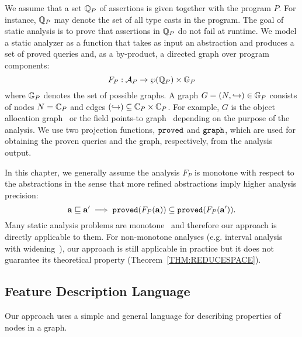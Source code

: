 We assume that a set $\mathbb{Q}_P$ of assertions is given together with the program $P$. For instance, $\mathbb{Q}_P$ may denote the set of all type casts in the program. The goal of static analysis is to prove that assertions in $\mathbb{Q}_P$ do not fail at runtime.
We model a static analyzer as a function that takes as input an abstraction and
produces a set of proved queries and, as a by-product, a directed graph over program components:
\[
F_P: \mathcal{A}_P \to \wp(\mathbb{Q}_P)\times \mathbb{G}_P
\]
where $\mathbb{G}_P$ denotes the set of possible graphs. A graph $G = (N,\hookrightarrow) \in \mathbb{G}_P$ consists of nodes $N = \mathbb{C}_P$ and edges $(\hookrightarrow) \subseteq \mathbb{C}_P \times \mathbb{C}_P$.
For example, $G$ is the object allocation graph~\cite{Li2018b} or the field points-to graph~\cite{Tan2017} depending on the purpose of the analysis.
We use two projection functions, ${\tt proved}$ and
${\tt graph}$, which are used for obtaining the proven queries and the graph, respectively, from the analysis output.

In this chapter, we generally assume  the analysis $F_P$ is monotone with respect to the abstractions in the sense that more refined abstractions imply higher analysis precision:
\begin{equation}\label{eq:mono}
{\bf a} \sqsubseteq {\bf a}' \implies {\tt proved}(F_P({\bf a})) \subseteq {{\tt proved}}(F_P({\bf a}')).
\end{equation}
Many static analysis problems are monotone~\cite{JeJeChOh17,Liang2011learning,Liang2011,Zhang2014,Li2018a,Tan2017} and therefore our approach is directly applicable to them. For non-monotone analyses (e.g. interval analysis with widening~\cite{cha2016learning}), our approach is still applicable in practice but it does not guarantee its theoretical property (Theorem~\ref{THM:REDUCESPACE}).

\subsection{Feature Description Language}\label{sec:feat-language}

Our approach uses a simple and general language for describing properties of nodes in a graph.



